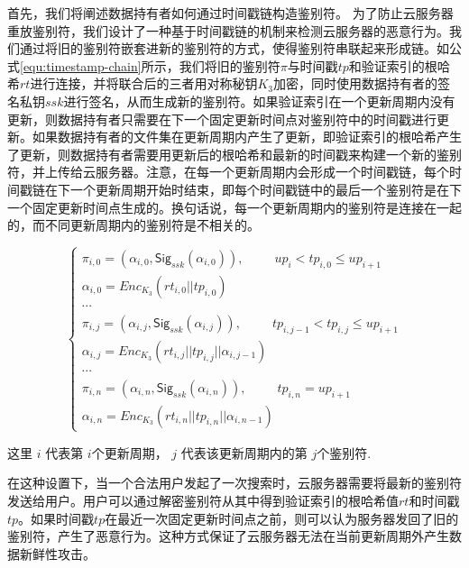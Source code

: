 首先，我们将阐述数据持有者如何通过时间戳链构造鉴别符。
为了防止云服务器重放鉴别符，我们设计了一种基于时间戳链的机制来检测云服务器的恶意行为。我们通过将旧的鉴别符嵌套进新的鉴别符的方式，使得鉴别符串联起来形成链。如公式\ref{equ:timestamp-chain}所示，我们将旧的鉴别符$\pi$与时间戳$tp$和验证索引的根哈希$rt$进行连接，并将联合后的三者用对称秘钥$K_3$加密，同时使用数据持有者的签名私钥$ssk$进行签名，从而生成新的鉴别符。如果验证索引在一个更新周期内没有更新，则数据持有者只需要在下一个固定更新时间点对鉴别符中的时间戳进行更新。如果数据持有者的文件集在更新周期内产生了更新，即验证索引的根哈希产生了更新，则数据持有者需要用更新后的根哈希和最新的时间戳来构建一个新的鉴别符，并上传给云服务器。注意，在每一个更新周期内会形成一个时间戳链，每个时间戳链在下一个更新周期开始时结束，即每个时间戳链中的最后一个鉴别符是在下一个固定更新时间点生成的。换句话说，每一个更新周期内的鉴别符是连接在一起的，而不同更新周期内的鉴别符是不相关的。


\begin{equation}
  \label{equ:timestamp-chain}
    \left\{
    \begin{array}{ll} %
      \pi_{i, 0} = (\alpha_{i, 0}, \mathsf{Sig}_{ssk}(\alpha_{i, 0})),~~~~~~~~~~~up_i < tp_{i, 0} \leq up_{i+1} \\
      \alpha_{i, 0} = Enc_{K_3}(rt_{i, 0}||tp_{i, 0}) \\
      \cdots \\

     \pi_{i, j} = (\alpha_{i, j}, \mathsf{Sig}_{ssk}(\alpha_{i, j})),~~~~~~~~~~~tp_{i, j-1} < tp_{i, j} \leq up_{i+1}  \\
     \alpha_{i, j} = Enc_{K_3}(rt_{i, j}||tp_{i, j}||\alpha_{i, j-1}) \\
      \cdots  \\
     \pi_{i, n} = (\alpha_{i, n}, \mathsf{Sig}_{ssk}(\alpha_{i, n})),~~~~~~~~~~~tp_{i, n}=up_{i+1} \\
     \alpha_{i, n} = Enc_{K_3}(rt_{i, n}||tp_{i, n}||\alpha_{i, n-1})
    \end{array}
    \right.
  \end{equation}

\noindent 这里 $i$ 代表第 $i$个更新周期， $j$ 代表该更新周期内的第 $j$个鉴别符.

在这种设置下，当一个合法用户发起了一次搜索时，云服务器需要将最新的鉴别符发送给用户。用户可以通过解密鉴别符从其中得到验证索引的根哈希值$rt$和时间戳$tp$。如果时间戳$tp$在最近一次固定更新时间点之前，则可以认为服务器发回了旧的鉴别符，产生了恶意行为。这种方式保证了云服务器无法在当前更新周期外产生数据新鲜性攻击。

